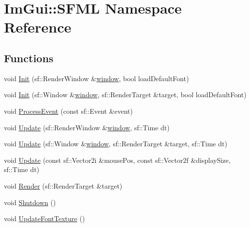 \hypertarget{namespace_im_gui_1_1_s_f_m_l}{}\section{Im\+Gui\+:\+:S\+F\+ML Namespace Reference}
\label{namespace_im_gui_1_1_s_f_m_l}
\subsection*{Functions}
\begin{DoxyCompactItemize}
\item 
void \mbox{\hyperlink{namespace_im_gui_1_1_s_f_m_l_ab68ea5215c08d005c6db5e5995c111ad}{Init}} (sf\+::\+Render\+Window \&\mbox{\hyperlink{_globals_8cpp_ae227837337adb8c62b56e2930ad81cda}{window}}, bool load\+Default\+Font)
\item 
void \mbox{\hyperlink{namespace_im_gui_1_1_s_f_m_l_a52384615894fc35d07dfaccb1bcdb514}{Init}} (sf\+::\+Window \&\mbox{\hyperlink{_globals_8cpp_ae227837337adb8c62b56e2930ad81cda}{window}}, sf\+::\+Render\+Target \&target, bool load\+Default\+Font)
\item 
void \mbox{\hyperlink{namespace_im_gui_1_1_s_f_m_l_a2086627a77c5a874cd299060b5f1c270}{Process\+Event}} (const sf\+::\+Event \&event)
\item 
void \mbox{\hyperlink{namespace_im_gui_1_1_s_f_m_l_a6ac5b3b4d267251063f3697b9fa0ac7d}{Update}} (sf\+::\+Render\+Window \&\mbox{\hyperlink{_globals_8cpp_ae227837337adb8c62b56e2930ad81cda}{window}}, sf\+::\+Time dt)
\item 
void \mbox{\hyperlink{namespace_im_gui_1_1_s_f_m_l_ad35c61a45ad310ce53f91db317de0244}{Update}} (sf\+::\+Window \&\mbox{\hyperlink{_globals_8cpp_ae227837337adb8c62b56e2930ad81cda}{window}}, sf\+::\+Render\+Target \&target, sf\+::\+Time dt)
\item 
void \mbox{\hyperlink{namespace_im_gui_1_1_s_f_m_l_a23e3d87824f8ec92ec879aa5fda774f4}{Update}} (const sf\+::\+Vector2i \&mouse\+Pos, const sf\+::\+Vector2f \&display\+Size, sf\+::\+Time dt)
\item 
void \mbox{\hyperlink{namespace_im_gui_1_1_s_f_m_l_a850ba18f010cf284347e6cbc2abb8dc4}{Render}} (sf\+::\+Render\+Target \&target)
\item 
void \mbox{\hyperlink{namespace_im_gui_1_1_s_f_m_l_a2e9801a991d524d4f26a5933cdf29e3d}{Shutdown}} ()
\item 
void \mbox{\hyperlink{namespace_im_gui_1_1_s_f_m_l_a1f969f6c562da1c000f4d5277a8ff075}{Update\+Font\+Texture}} ()

\end{DoxyCompactItemize}
